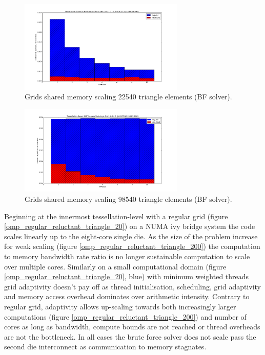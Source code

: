 \documentclass[times,12pt]{article}
\begin{document}
\begin{figure}[htb]
  \begin{center}
    \includegraphics[width=0.7\textwidth]{experiments/omp/omp_mesh_regular-reluctant_20.png}
  \end{center}
  \caption{Grids shared memory scaling 22540 triangle elements (BF solver).}
  \label{figure:omp_regular_reluctant_triangle_20}
\end{figure}

\begin{figure}[htb]
  \begin{center}
    \includegraphics[width=0.7\textwidth]{experiments/omp/omp_mesh_regular-reluctant_200.png}
  \end{center}
  \caption{Grids shared memory scaling 98540 triangle elements (BF solver).}
  \label{figure:omp_regular_reluctant_triangle_200}
\end{figure}


Beginning at the innermost tessellation-level with a regular grid (figure \ref{omp_regular_reluctant_triangle_20}) on a NUMA ivy bridge system the code scales linearly up to the eight-core single die. As the size of the problem increase for weak scaling (figure \ref{omp_regular_reluctant_triangle_200}) the computation to memory bandwidth rate ratio is no longer sustainable computation to scale over multiple cores. Similarly on a small computational domain (figure \ref{omp_regular_reluctant_triangle_20}, blue) with minimum weighted threads grid adaptivity doesn't pay off as thread initialisation, scheduling, grid adaptivity and memory access overhead dominates over arithmetic intensity. Contrary to regular grid, adaptivity allows up-scaling towards both increasingly larger computations (figure \ref{omp_regular_reluctant_triangle_200}) and number of cores as long as bandwidth, compute bounds are not reached or thread overheads are not the bottleneck. In all cases the brute force solver does not scale pass the second die interconnect as communication to memory stagnates.
\end{document}
